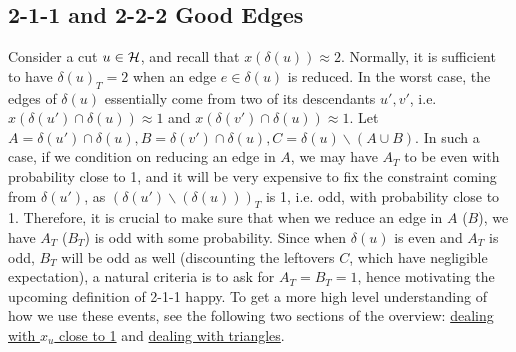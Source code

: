 \subsection{2-1-1 and 2-2-2 Good Edges}
\label{sec:211goodedges}

Consider a cut $u \in \mathcal{H}$, and recall that $x(\delta(u)) \approx 2$. Normally, it is sufficient to have $\delta(u)_T = 2$ when an edge $e \in \delta(u)$ is reduced. In the worst case, the edges of $\delta(u)$ essentially come from two of its descendants $u',v'$, i.e. $x(\delta(u') \cap \delta(u)) \approx 1$ and $x(\delta(v') \cap \delta(u)) \approx 1$. Let $A=\delta(u') \cap \delta(u),B=\delta(v') \cap \delta(u),C=\delta(u)\smallsetminus (A \cup B)$. In such a case, if we condition on reducing an edge in $A$, we may have $A_T$ to be even with probability close to 1, and it will be very expensive to fix the constraint coming from $\delta(u')$, as $(\delta(u') \smallsetminus(\delta(u)))_T$ is 1, i.e. odd, with probability close to 1. Therefore, it is crucial to make sure that when we reduce an edge in $A$ ($B$), we have $A_T$ ($B_T$) is odd with some probability. Since when $\delta(u)$ is even and $A_T$ is odd, $B_T$ will be odd as well (discounting the leftovers $C$, which have negligible expectation), a natural criteria is to ask for $A_T=B_T=1$, hence motivating the upcoming definition of 2-1-1 happy. To get a more high level understanding of how we use these events, see the following two sections of the overview: \hyperlink{ABC-explanation}{dealing with $x_u$ close to 1} and \hyperlink{211-explanation}{dealing with triangles}.   
 
